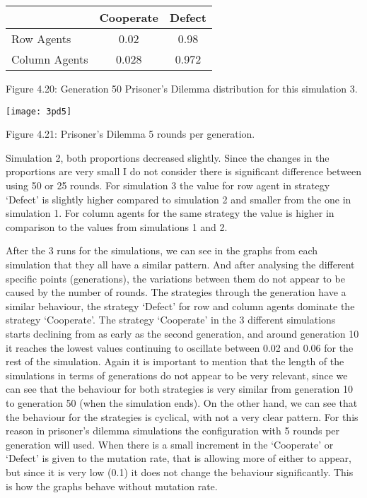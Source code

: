 \documentclass{article}
\begin{document}
\begin{center}
\begin{tabular}{|l|c|c|}
\hline
& Cooperate & Defect \\ 
\hline
Row Agents & 0.02 & 0.98\\
\hline
Column Agents & 0.028 & 0.972\\
\hline
\end{tabular}
\end{center}
\begin{center}
Figure 4.20: Generation 50 Prisoner’s Dilemma distribution for this simulation 3.
\end{center}
\begin{center}
	\texttt{[image: 3pd5]}

Figure 4.21: Prisoner's Dilemma 5 rounds per generation.
\end{center}
Simulation 2, both proportions decreased slightly. Since the changes in the proportions are very small I do not consider there is significant difference between using 50 or 25 rounds. For simulation 3 the value for row agent in strategy `Defect' is slightly higher compared to simulation 2  and smaller from the one in simulation 1. For column agents for the same strategy the value is higher in comparison to the values from simulations 1 and 2.


After the 3 runs for the simulations, we can see in the graphs from each simulation that they all have a similar pattern. And after analysing the different specific points (generations), the variations between them do not appear to be caused by the number of rounds. The strategies through the generation have a similar behaviour, the strategy `Defect' for row and column agents dominate the strategy `Cooperate'. The strategy `Cooperate' in the 3 different simulations starts declining from as early as the second generation, and around generation 10 it reaches the lowest values continuing to oscillate between 0.02 and 0.06 for the rest of the simulation. Again it is important to mention that the length of the simulations in terms of generations do not appear to be very relevant, since we can see that the behaviour for both strategies is very similar from generation 10 to generation 50 (when the simulation ends). On the other hand, we can see that the behaviour for the strategies is cyclical, with not a very clear pattern. For this reason in prisoner's dilemma simulations the configuration with 5 rounds per generation will used.
When there is a small increment in the `Cooperate' or `Defect' is given to the mutation rate, that is allowing more of either to appear, but since it is very low (0.1) it does not change the behaviour significantly. This is how the graphs behave without mutation rate.
\end{document}
